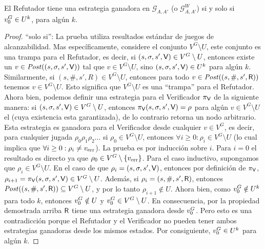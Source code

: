 \begin{lemma} \label{lm:RefWinStrat} El Refutador tiene una estrategia ganadora en $\mathcal{G}_{A, A'}$ (o $\mathcal{G}^W_{A, A'}$) si y solo si $v_0^G \in U^k$, para algún $k$.
\end{lemma}
\begin{proof} 
``solo si'': La prueba utiliza resultados estándar de juegos de alcanzabilidad. Mas específicamente, considere el conjunto $V^G \setminus U$, este conjunto es una trampa para el Refutador, es decir, si $(s,\sigma, s', \mathsf{V}) \in V^G \setminus U$, entonces existe un $v \in \mathit{Post}((s,\sigma, s', \mathsf{V}))$ tal que 
$v \in V^G \setminus U$, sino
$(s,\sigma, s', \mathsf{V}) \in U^k$ para algún $k$. Similarmente, si $(s,\#, s', R) \in V^G \setminus U$, entonces para todo $v \in \mathit{Post}((s,\#, s', \mathsf{R}))$ 
tenemos $v \in V^G \setminus U$. Esto significa que $V^G \setminus U$ es una ``trampa'' para el Refutador. 
Ahora bien, podemos definir una estrategia para el Verificador $\pi_{\mathsf{V}}$ de la siguiente manera: si $(s, \sigma, s', \mathsf{V}) \in V^G \setminus U$, entonces
$\pi_{\mathsf{V}}(s, \sigma, s', \mathsf{V}) = \rho$ para algún $v \in V^G \setminus U$ el (cuya existencia esta garantizada), de lo contrario retorna un nodo arbitrario. 
Esta estrategia es ganadora para el Verificador desde cualquier $v \in V^G$, es decir, para cualquier jugada $\rho_0 \rho_1 \rho_2 \dots$ 
si $\rho_0 \in V^G \setminus U$, entonces $\forall i \geq 0: \rho_i \in V^G \setminus U$ 
(lo cual implica que $\forall i \geq 0: \rho_i \neq v_{\text{err}}$). 
La prueba es por inducción sobre $i$. Para $i=0$ el resultado es directo ya que $\rho_0 \in V^G \setminus \{v_{\text{err}}\}$. Para el caso inductivo,
supongamos que $\rho_i \in V^G \setminus U$. En el caso de que $\rho_i = (s, \sigma, s', \mathsf{V})$, entonces por definición de $\pi_{\mathsf{V}}$, 
$\rho_{i+1} = \pi_{\mathsf{V}}(s,\sigma, s', \mathsf{V}) \in V^G \setminus U$.
Además, si $\rho_i = (s, \#, s', \mathsf{R})$, entonces $\mathit{Post}((s, \#, s', \mathsf{R})) \subseteq V^G \setminus U$, 
y por lo tanto $\rho_{i+1} \notin U$. 
Ahora bien, como $v_0^G \notin U^k$ para todo $k$, entonces $v_0^G \notin U$ y $v_0^G \in V^G \setminus U$. 
En consecuencia, por la propiedad demostrada arriba $\mathsf{R}$ tiene una estrategia ganadora desde 
$v_0^G$. Pero esto es una contradicción porque el Refutador y el Verificador no pueden tener ambos estrategias ganadoras desde los mismos estados.
Por consiguiente, $v_0^G \in U^k$ para algún $k$.
	

\end{proof}
